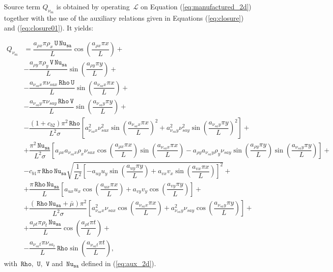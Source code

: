 \documentclass[10pt]{article}
\newcommand{\Rho}{\,\mathtt{Rho}}
\newcommand{\U}{\,\mathtt{U}}
\newcommand{\V}{\,\mathtt{V}}
\newcommand{\Nu}{\,\mathtt{Nu_{sa}}}
\newcommand{\Lo}{\,\mathcal{L}}
\newcommand{\sa}{\nu_{\mathrm{sa}}}
\newcommand{\bmu}{\bar{\mu}}
\begin{document}
Source term $Q_{\sa}$ is obtained by operating $\Lo$ on Equation  (\ref{eq:manufactured_2d}) together with the use of the  auxiliary relations given in Equations (\ref{eq:closure}) and  (\ref{eq:closure01}). It yields:

\begin{equation}
 \begin{split}
  Q_{\sa} &= \dfrac{a_{\rho x} \pi \rho_x \U \Nu  }{L}\cos\left(\dfrac{a_{\rho x} \pi x}{L}\right)+ \\
&-\dfrac{a_{\rho y} \pi \rho_y \V \Nu }{L}\sin\left(\dfrac{a_{\rho y} \pi y}{L}\right)+ \\
&-\dfrac{a_{\nu_{sa} x} \pi \nu_{sa x} \Rho \U }{L}\sin\left(\dfrac{a_{\nu_{sa} x} \pi x}{L}\right)+ \\
&-\dfrac{a_{\nu_{sa} y} \pi \nu_{sa y} \Rho \V }{L}\sin\left(\dfrac{a_{\nu_{sa} y} \pi y}{L}\right)+ \\
&-\dfrac{(1+c_{b2}) \pi^2 \Rho}{L^2 \sigma}\left[a_{\nu_{sa} x}^2 \nu_{sa x}^2  \sin\left(\dfrac{a_{\nu_{sa} x} \pi x}{L}\right)^2+a_{\nu_{sa} y}^2 \nu_{sa y}^2  \sin\left(\dfrac{a_{\nu_{sa} y} \pi y}{L}\right)^2\right]+\\
&+\dfrac{\pi^2 \Nu}{ L^2\sigma}\left[a_{\rho x} a_{\nu_{sa} x} \rho_x \nu_{sa x}  \cos\left(\dfrac{a_{\rho x} \pi x}{L}\right)  \sin\left(\dfrac{a_{\nu_{sa} x} \pi x}{L}\right)-a_{\rho y} a_{\nu_{sa} y} \rho_y \nu_{sa y}  \sin\left(\dfrac{a_{\rho y} \pi y}{L}\right)  \sin\left(\dfrac{a_{\nu_{sa} y} \pi y}{L}\right)\right] +\\
 &-c_{b1}  \pi \Rho \Nu \sqrt{\dfrac{1}{L^2} \left[-a_{uy} u_y  \sin\left(\dfrac{a_{uy} \pi y}{L}\right)+a_{vx} v_x  \sin\left(\dfrac{a_{vx} \pi x}{L}\right)\right]^2}+\\
&+\dfrac{\pi \Rho \Nu}{L}\left[a_{ux} u_x  \cos\left(\dfrac{a_{ux} \pi x}{L}\right)+a_{vy} v_y  \cos\left(\dfrac{a_{vy} \pi y}{L}\right)\right] + \\
 &+\dfrac{(\Rho \Nu+\bmu) \pi^2}{L^2 \sigma}\left[a_{\nu_{sa} x}^2 \nu_{sa x}  \cos\left(\dfrac{a_{\nu_{sa} x} \pi x}{L}\right)+a_{\nu_{sa} y}^2 \nu_{sa y}  \cos\left(\dfrac{a_{\nu_{sa} y} \pi y}{L}\right)\right]+\\
&+ \dfrac{a_{\rho t} \pi \rho_t \Nu}{L} \cos\left(\dfrac{a_{\rho t} \pi t}{L}\right)+\\
&- \dfrac{a_{\nu_{sa}t} \pi \nu_{sa_t}}{L} \Rho \sin\left(\dfrac{a_{\nu_{sa} t} \pi t}{L}\right),
 \end{split}
\end{equation}
with  $\Rho,\, \U,\,\V$ and $\Nu$ defined in (\ref{eq:aux_2d}).
\end{document}

